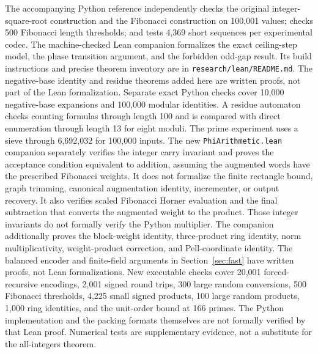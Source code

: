 \documentclass[11pt]{article}
\theoremstyle{definition}\newtheorem{definition}[theorem]{Definition}
\begin{document}
The accompanying Python reference independently checks the original
integer-square-root construction and the Fibonacci construction on
100,001 values; checks 500 Fibonacci length thresholds; and tests
4,369 short sequences per experimental codec. The machine-checked Lean companion
formalizes the exact ceiling-step model, the phase transition argument,
and the forbidden odd-gap result. Its build instructions and precise
theorem inventory are in \texttt{research/lean/README.md}.
The negative-base identity and residue theorems added here are written
proofs, not part of the Lean formalization. Separate exact Python checks
cover 10,000 negative-base expansions and 100,000 modular identities.
A residue automaton checks counting formulas through length 100 and is
compared with direct enumeration through length 13 for eight moduli.
The prime experiment uses a sieve through 6,692,032 for 100,000 inputs.
The new \texttt{PhiArithmetic.lean} companion separately verifies the
integer carry invariant and proves the acceptance condition equivalent
to addition, assuming the augmented words have the prescribed Fibonacci
weights. It does not formalize the finite rectangle bound, graph trimming,
canonical augmentation identity, incrementer, or output recovery.
It also verifies scaled Fibonacci Horner evaluation and the final
subtraction that converts the augmented weight to the product. Those
integer invariants do not formally verify the Python multiplier.
The companion additionally proves the block-weight identity, three-product
ring identity, norm multiplicativity, weight-product correction, and
Pell-coordinate identity. The balanced encoder and finite-field arguments
in Section~\ref{sec:fast} have written proofs, not Lean formalizations.
New executable checks cover 20,001 forced-recursive encodings, 2,001
signed round trips, 300 large random conversions, 500 Fibonacci thresholds,
4,225 small signed products, 100 large random products, 1,000 ring identities,
and the unit-order bound at 166 primes.
The Python implementation and the packing formats themselves are not
formally verified by that Lean proof. Numerical tests are supplementary
evidence, not a substitute for the all-integers theorem.
\end{document}
